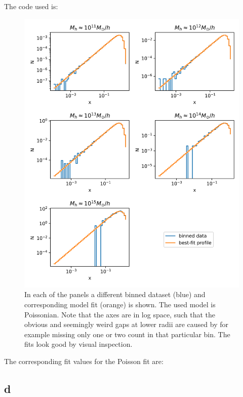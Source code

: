 The code used is:


\begin{figure}[h!]
    \centering
    \includegraphics[width=0.9\linewidth]{./my_solution_1c.png}
    \caption{In each of the panels a different binned dataset (blue) and corresponding model fit (orange) is shown. The used model is Poissonian.
    Note that the axes are in log space, such that the obvious and seemingly weird gaps at lower radii are caused by for example missing only one or two count in that particular bin.
    The fits look good by visual inspection.}
    \label{fig:1c}
\end{figure}

The corresponding fit values for the Poisson fit are:




\subsection{d}

